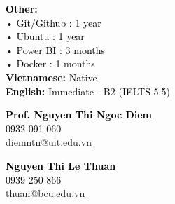 \documentclass[10pt,a4paper,ragged2e,withhyper]{altacv}
\begin{document}
\begin{paracol}{2}
            \textcolor{black}{\textbf{Other:}} \\
            \vspace{0.8em}
            \hspace{3em} • \hspace{0.5em} \textcolor{black}{Git/Github : 1 year} \\
            \vspace{0.5em}
            \hspace{3em} • \hspace{0.5em} \textcolor{black}{Ubuntu : 1 year} \\
            \vspace{0.5em}
            \hspace{3em} • \hspace{0.5em} \textcolor{black}{Power BI : 3 months} \\
            \vspace{0.5em}
            \hspace{3em} • \hspace{0.5em} \textcolor{black}{Docker : 1 months} \\
        
            \textcolor{black}{\textbf{Vietnamese:}}  \textcolor{black}{Native} \\
            \vspace{0.8em}
            \textcolor{black}{\textbf{English:}}  \textcolor{black}{Immediate - B2 (IELTS 5.5)}
            
            \textcolor{black}{\textbf{Prof. Nguyen Thi Ngoc Diem}} \\
            \vspace{0.5em}
            \textcolor{blue}{}  \textcolor{black}{0932 091 060} \\
            \vspace{0.5em}
            \textcolor{blue}{} \textcolor{black}{\href{mailto:diemntn@uit.edu.vn}{diemntn@uit.edu.vn}} \\
            \vspace{2em}
            
            \textcolor{black}{\textbf{Nguyen Thi Le Thuan}} \\
            \vspace{0.5em}
            \textcolor{blue}{}  \textcolor{black}{0939 250 866} \\
            \vspace{0.5em}
            \textcolor{blue}{} \textcolor{black}{\href{mailto:thuan@bcu.edu.vn}{thuan@bcu.edu.vn}} \\
            \vspace{0.8em}
        

\end{paracol}
\end{document}
